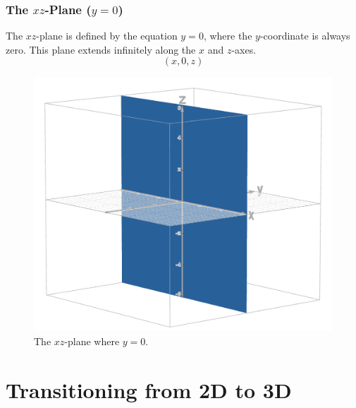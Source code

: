 \documentclass{article}
\begin{document}
\begin{conceptbox}
\begin{blankbox}
        \subsubsection*{The \( xz \)-Plane (\( y = 0 \))}
        \begin{minipage}{0.4\textwidth}
            The \( xz \)-plane is defined by the equation \( y = 0 \), where the \( y \)-coordinate is always zero. 
            This plane extends infinitely along the \( x \) and \( z \)-axes.
            \[
                (x, 0, z)
            \]
        \end{minipage}
        \begin{minipage}{0.5\textwidth}
            \begin{figure}[H]
                \centering
                \includegraphics[width=\textwidth]{xz plane.png}
                \caption{The \( xz \)-plane where \( y = 0 \).}
                \label{fig:xz_plane}
            \end{figure}
        \end{minipage}
    \end{blankbox}
    
\end{conceptbox}    

\section*{Transitioning from 2D to 3D}
\end{document}
